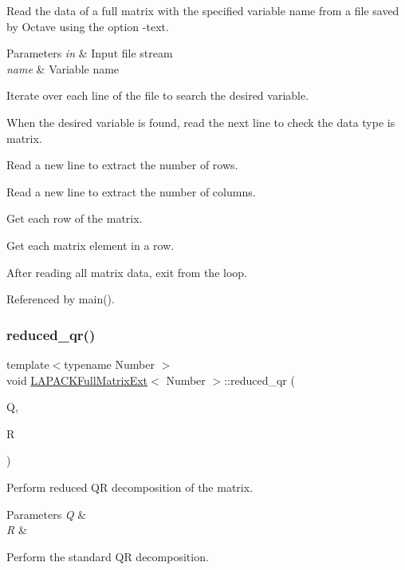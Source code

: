 Read the data of a full matrix with the specified variable name from a file saved by Octave using the option {\ttfamily -\/text}.


\begin{DoxyParams}{Parameters}
{\em in} & Input file stream \\
\hline
{\em name} & Variable name \\
\hline
\end{DoxyParams}
Iterate over each line of the file to search the desired variable.

When the desired variable is found, read the next line to check the data type is {\ttfamily matrix}.

Read a new line to extract the number of rows.

Read a new line to extract the number of columns.

Get each row of the matrix.

Get each matrix element in a row.

After reading all matrix data, exit from the loop.

Referenced by main().

\mbox{\label{classLAPACKFullMatrixExt_a2d29694b336c319402fd867658a25253}} 
\subsubsection{\texorpdfstring{reduced\+\_\+qr()}{reduced\_qr()}}
{\footnotesize\ttfamily template$<$typename Number $>$ \\
void \hyperlink{classLAPACKFullMatrixExt}{L\+A\+P\+A\+C\+K\+Full\+Matrix\+Ext}$<$ Number $>$\+::reduced\+\_\+qr (\begin{DoxyParamCaption}\item[{\hyperlink{classLAPACKFullMatrixExt}{L\+A\+P\+A\+C\+K\+Full\+Matrix\+Ext}$<$ Number $>$ \&}]{Q,  }\item[{\hyperlink{classLAPACKFullMatrixExt}{L\+A\+P\+A\+C\+K\+Full\+Matrix\+Ext}$<$ Number $>$ \&}]{R }\end{DoxyParamCaption})}

Perform reduced QR decomposition of the matrix. 
\begin{DoxyParams}{Parameters}
{\em Q} & \\
\hline
{\em R} & \\
\hline
\end{DoxyParams}
Perform the standard QR decomposition.

